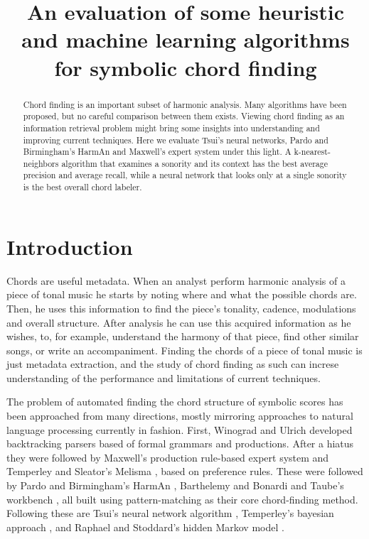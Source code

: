 \documentclass{article}
\title{An evaluation of some heuristic and machine learning algorithms for
  symbolic chord finding} \oneauthor {}{}
\begin{document}
\graphicspath{{figs/}{data/}}
\maketitle

\begin{abstract}
  Chord finding is an important subset of harmonic analysis. Many
  algorithms have been proposed, but no careful comparison between
  them exists. Viewing chord finding as an information retrieval
  problem might bring some insights into understanding and improving
  current techniques. Here we evaluate Tsui's neural networks, Pardo
  and Birmingham's HarmAn and Maxwell's expert system under this
  light. A k-nearest-neighbors algorithm that examines a sonority and
  its context has the best average precision and average recall, while
  a neural network that looks only at a single sonority is the best
  overall chord labeler.
\end{abstract}

\section{Introduction}
\label{sec:introduction}


Chords are useful metadata. When an analyst perform harmonic analysis
of a piece of tonal music he starts by noting where and what the
possible chords are. Then, he uses this information to find the
piece's tonality, cadence, modulations and overall structure. After
analysis he can use this acquired information as he wishes, to, for
example, understand the harmony of that piece, find other similar
songs, or write an accompaniment. Finding the chords of a piece of
tonal music is just metadata extraction, and the study of chord
finding as such can increse understanding of the performance and
limitations of current techniques.

The problem of automated finding the chord structure of symbolic
scores has been approached from many directions, mostly mirroring
approaches to natural language processing currently in fashion.
First, Winograd \cite{winograd:linguistics} and Ulrich
\cite{ulrich:analysis} developed backtracking parsers based of formal
grammars and productions. After a hiatus they were followed by
Maxwell's \cite{maxwell:expert} production rule-based expert system
and Temperley and Sleator's Melisma \cite{temperley.ea:modeling},
based on preference rules. These were followed by Pardo and
Birmingham's HarmAn \cite{pardo.ea:algorithms}, Barthelemy and Bonardi
\cite{barthelemy.ea:figured} and Taube's workbench
\cite{taube:automatic}, all built using pattern-matching as their core
chord-finding method. Following these are Tsui's
neural network algorithm \cite{tsui:harmonic}, Temperley's 
bayesian approach \cite{temperley:bayesian}, and Raphael and
Stoddard's hidden Markov model \cite{raphael.ea:harmonic}.
\end{document}
